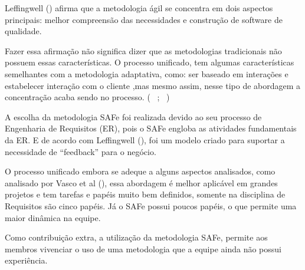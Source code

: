 Leffingwell (\citeyear{safe}) afirma que a metodologia ágil se concentra em dois aspectos principais: 
melhor compreensão das necessidades e construção de software de qualidade. 

Fazer essa afirmação não significa dizer que as metodologias tradicionais não possuem essas características. O processo unificado, 
tem algumas características semelhantes com a metodologia adaptativa, como: ser baseado em interações e estabelecer interação com o cliente
,mas mesmo assim, nesse tipo de abordagem a concentração acaba sendo no processo. (~\cite{safe} ; ~\cite{vasco})

A escolha da metodologia SAFe foi realizada devido ao seu processo de Engenharia de Requisitos (ER), pois o SAFe engloba as atividades
fundamentais da ER. E de acordo com Leffingwell (\citeyear{safe}), foi um modelo criado para suportar a necessidade de ``feedback''
para o negócio. 

O processo unificado embora se adeque a alguns aspectos analisados, como analisado por Vasco et al (\citeyear{vasco}),
essa abordagem é melhor  aplicável em grandes projetos e tem tarefas e papéis muito bem definidos, somente na 
disciplina de Requisitos são cinco papéis. Já o SAFe possui poucos papéis, o que permite uma maior 
dinâmica na equipe.

Como contribuição extra, a utilização da metodologia SAFe, permite aos membros vivenciar
o uso de uma metodologia que a equipe ainda não possui experiência.

